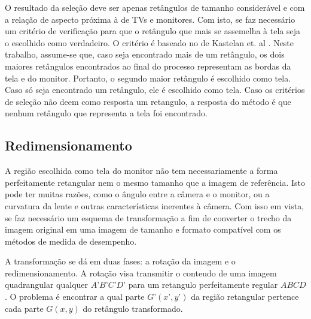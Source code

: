 O resultado da seleção deve ser apenas retângulos de tamanho considerável e com a relação de aspecto próxima à de TVs e monitores. Com isto, se faz necessário um critério de verificação para que o retângulo que mais se assemelha à tela seja o escolhido como verdadeiro. O critério é baseado no de Kastelan et. al \cite{inspect}. Neste trabalho, assume-se que, caso seja encontrado mais de um retângulo, os dois maiores retângulos encontrados ao final do processo representam as bordas da tela e do monitor. Portanto, o segundo maior retângulo é escolhido como tela. Caso só seja encontrado um retângulo, ele é escolhido como tela. Caso os critérios de seleção não deem como resposta um retangulo, a resposta do método é que nenhum retângulo que representa a tela foi encontrado.

\subsection{Redimensionamento} \label{redim}

A região escolhida como tela do monitor não tem necessariamente a forma perfeitamente retangular nem o mesmo tamanho que a imagem de referência. Isto pode ter muitas razões, como o ângulo entre a câmera e o monitor, ou a curvatura da lente e outras características inerentes à câmera. Com isso em vista, se faz necessário um esquema de transformação a fim de converter o trecho da imagem original em uma imagem de tamanho e formato compatível com os métodos de medida de desempenho.

A transformação se dá em duas fases: a rotação da imagem e o redimensionamento. A rotação visa transmitir o conteudo de uma imagem quadrangular qualquer $A’B’C’D’$ para um retangulo perfeitamente regular $ABCD$. O problema é encontrar a qual parte $G’(x’,y’)$ da região retangular pertence cada parte $G(x,y)$ do retângulo transformado.

